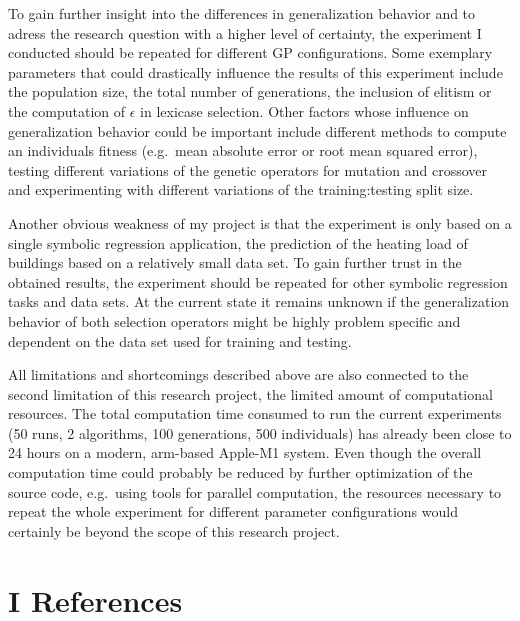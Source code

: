 \documentclass[
  12pt,
]{article}
\begin{document}
To gain further insight into the differences in generalization behavior
and to adress the research question with a higher level of certainty,
the experiment I conducted should be repeated for different GP
configurations. Some exemplary parameters that could drastically
influence the results of this experiment include the population size,
the total number of generations, the inclusion of elitism or the
computation of \(\epsilon\) in lexicase selection. Other factors whose
influence on generalization behavior could be important include
different methods to compute an individuals fitness (e.g.~mean absolute
error or root mean squared error), testing different variations of the
genetic operators for mutation and crossover and experimenting with
different variations of the training:testing split size.

Another obvious weakness of my project is that the experiment is only
based on a single symbolic regression application, the prediction of the
heating load of buildings based on a relatively small data set. To gain
further trust in the obtained results, the experiment should be repeated
for other symbolic regression tasks and data sets. At the current state
it remains unknown if the generalization behavior of both selection
operators might be highly problem specific and dependent on the data set
used for training and testing.

All limitations and shortcomings described above are also connected to
the second limitation of this research project, the limited amount of
computational resources. The total computation time consumed to run the
current experiments (50 runs, 2 algorithms, 100 generations, 500
individuals) has already been close to 24 hours on a modern, arm-based
Apple-M1 system. Even though the overall computation time could probably
be reduced by further optimization of the source code, e.g.~using tools
for parallel computation, the resources necessary to repeat the whole
experiment for different parameter configurations would certainly be
beyond the scope of this research project.

\newpage

\hypertarget{I}{%
\section*{I References}\label{I}}
\end{document}
